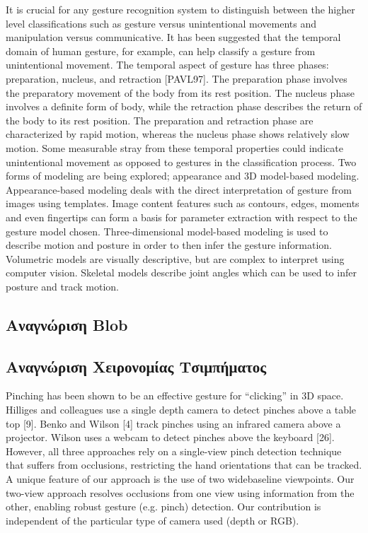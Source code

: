 It is crucial for any gesture recognition system to distinguish between the higher level classifications such as gesture versus unintentional movements and manipulation versus communicative. It has been suggested that the temporal domain of human gesture, for example, can help classify a gesture from unintentional movement. The temporal aspect of gesture has three phases: preparation, nucleus, and retraction [PAVL97]. The preparation phase involves the preparatory movement of the body from its rest position. The nucleus phase involves a definite form of body, while the retraction phase describes the return of the body to its rest position. The preparation and retraction phase are characterized by rapid motion, whereas the nucleus phase shows relatively slow motion. Some measurable stray from these temporal properties could indicate unintentional movement as opposed to gestures in the classification process. Two forms of modeling are being explored; appearance and 3D model-based modeling. Appearance-based modeling deals with the direct interpretation of gesture from images using templates. Image content features such as contours, edges, moments and even fingertips can form a basis for parameter extraction with respect to the gesture model chosen. Three-dimensional model-based modeling is used to describe motion and posture in order to then infer the gesture information. Volumetric models are visually descriptive, but are complex to interpret using computer vision. Skeletal models describe joint angles which can be used to infer posture and track motion.


\subsection{Αναγνώριση Blob}


\subsection{Αναγνώριση Χειρονομίας Τσιμπήματος}



Pinching has been shown to be an effective gesture for “clicking”
in 3D space. Hilliges and colleagues use a single depth
camera to detect pinches above a table top [9]. Benko and
Wilson [4] track pinches using an infrared camera above a
projector. Wilson uses a webcam to detect pinches above
the keyboard [26]. However, all three approaches rely on
a single-view pinch detection technique that suffers from occlusions,
restricting the hand orientations that can be tracked.
A unique feature of our approach is the use of two widebaseline
viewpoints. Our two-view approach resolves occlusions
from one view using information from the other, enabling
robust gesture (e.g. pinch) detection. Our contribution
is independent of the particular type of camera used (depth
or RGB).

